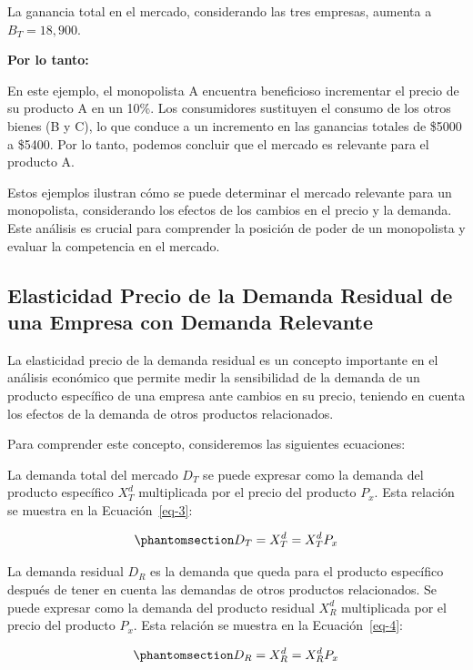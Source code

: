 \documentclass[
  doc,
  floatsintext,
  longtable,
  a4paper,
  nolmodern,
  notxfonts,
  notimes,
  12pt,
  colorlinks=true,linkcolor=blue,citecolor=blue,urlcolor=blue]{apa7}
\begin{document}
La ganancia total en el mercado, considerando las tres empresas, aumenta
a \(B_T = 18,900\).

\textbf{Por lo tanto:}

En este ejemplo, el monopolista A encuentra beneficioso incrementar el
precio de su producto A en un 10\%. Los consumidores sustituyen el
consumo de los otros bienes (B y C), lo que conduce a un incremento en
las ganancias totales de \$5000 a \$5400. Por lo tanto, podemos concluir
que el mercado es relevante para el producto A.

Estos ejemplos ilustran cómo se puede determinar el mercado relevante
para un monopolista, considerando los efectos de los cambios en el
precio y la demanda. Este análisis es crucial para comprender la
posición de poder de un monopolista y evaluar la competencia en el
mercado.

\subsection{Elasticidad Precio de la Demanda Residual de una Empresa con
Demanda
Relevante}\label{elasticidad-precio-de-la-demanda-residual-de-una-empresa-con-demanda-relevante}

La elasticidad precio de la demanda residual es un concepto importante
en el análisis económico que permite medir la sensibilidad de la demanda
de un producto específico de una empresa ante cambios en su precio,
teniendo en cuenta los efectos de la demanda de otros productos
relacionados.

Para comprender este concepto, consideremos las siguientes ecuaciones:

La demanda total del mercado \(D_T\) se puede expresar como la demanda
del producto específico \(X_T^d\) multiplicada por el precio del
producto \(P_x\). Esta relación se muestra en la Ecuación~\ref{eq-3}:

\begin{equation}\protect\phantomsection\label{eq-3}{
D_T = X_{T}^{d} = X_{T}^{d} P_{x}
}\end{equation}

La demanda residual \(D_R\) es la demanda que queda para el producto
específico después de tener en cuenta las demandas de otros productos
relacionados. Se puede expresar como la demanda del producto residual
\(X_R^d\) multiplicada por el precio del producto \(P_x\). Esta relación
se muestra en la Ecuación~\ref{eq-4}:

\begin{equation}\protect\phantomsection\label{eq-4}{
D_R = X_R^d = X_R^d P_x
}\end{equation}
\end{document}
